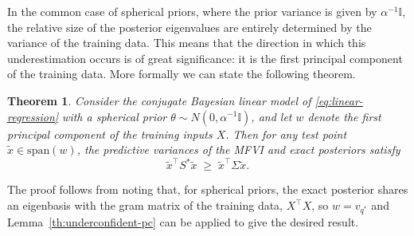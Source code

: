 \documentclass{article}
\theoremstyle{plain}
\newtheorem{theorem}{Theorem}[section]
\theoremstyle{definition}
\theoremstyle{remark}
\theoremstyle{plain}
\newcommand{\prior}{\alpha^{-1} \mathbb{I}}
\newcommand{\posterior}{\Sigma}
\begin{document}
In the common case of spherical priors, where the prior variance is given by $\prior$, the relative size of the posterior eigenvalues are entirely determined by the variance of the training data. This means that the direction in which this underestimation occurs is of great significance: it is the first principal component of the training data. More formally we can state the following theorem. 
\begin{theorem}
\label{th:pc-remark}
Consider the conjugate Bayesian linear model of \cref{eq:linear-regression} with a spherical prior $\theta \sim N(0, \prior)$, and let $w$ denote the first principal component of the training inputs $X$. Then for any test point $\tilde x \in \text{span}(w)$, the predictive variances of the MFVI and exact posteriors satisfy
\begin{equation}
    \tilde x^\top S^* \tilde x \;\geq\; \tilde x^\top \posterior \tilde x.
\end{equation}
\end{theorem}
The proof follows from noting that, for spherical priors, the exact posterior shares an eigenbasis with the gram matrix of the training data, $X^\top X$, so $w = v_{q^*}$ and Lemma~\ref{th:underconfident-pc} can be applied to give the desired result.
\end{document}
